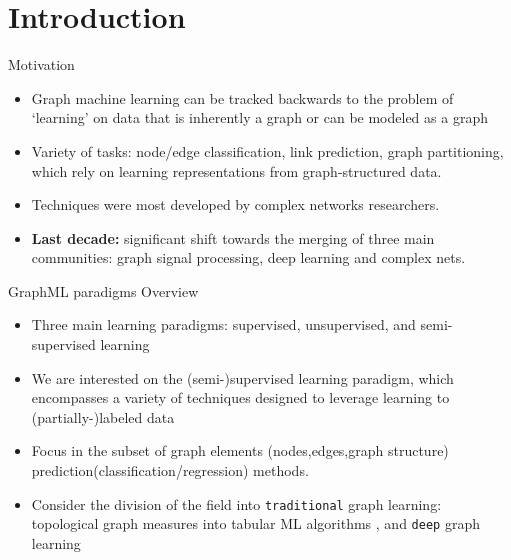 \section{Introduction}

\begin{frame}{Motivation}
\begin{itemize}
    \item Graph machine learning can be tracked backwards to the problem of `learning' on data that is inherently a graph \cite{silva2016machine, JMLR:Perozzi} or can be modeled as a graph \cite{verri2013,grape2020}
    \item Variety of tasks:  node/edge classification, link prediction, graph partitioning, which rely on learning representations from graph-structured data.
    \item  Techniques were most developed by complex networks researchers.
    \item \textbf{Last decade:} significant shift towards the merging of three main communities: graph signal processing, deep learning and complex nets.
    
\end{itemize}
\end{frame}

\begin{frame}{GraphML paradigms Overview}
    \begin{itemize}
        \item Three main learning paradigms: supervised, unsupervised, and semi-supervised learning
        \item We are interested on the (semi-)supervised learning paradigm, which encompasses a variety of techniques designed to leverage learning to (partially-)labeled data \cite{verri2018advantages,amanciof}
        \item  Focus in the subset of graph elements (nodes,edges,graph structure) prediction(classification/regression) methods.
        \item Consider the division of the field into \texttt{traditional} graph learning: topological graph measures into tabular ML algorithms  \cite{costa2007characterization, silva2016machine}, and \texttt{deep} graph learning
    \end{itemize}
\end{frame}

